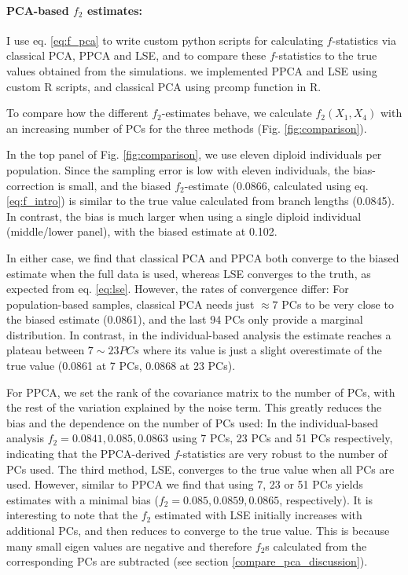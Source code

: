 \documentclass[12pt]{article}
\begin{document}
\paragraph{PCA-based $f_2$ estimates:}
I use eq. \ref{eq:f_pca} to write custom python scripts for calculating $f$-statistics via  classical PCA, PPCA and LSE, and to compare these $f$-statistics to the true values obtained from  the simulations. we implemented PPCA and LSE using custom R scripts, and classical PCA using prcomp function in R. 

To compare how the different $f_2$-estimates behave, we calculate $f_2(X_1, X_4)$  with an increasing number of PCs for the three methods (Fig. \ref{fig:comparison}).  

In the top panel of Fig. \ref{fig:comparison}, we use eleven diploid individuals per population. Since the sampling error is low with eleven individuals, the bias-correction is small, and the biased $f_2$-estimate (0.0866, calculated using eq. \ref{eq:f_intro}) is similar to the true value calculated from branch lengths (0.0845). In contrast, the bias is much larger when using a single diploid individual (middle/lower panel), with the biased estimate at 0.102. 

In either case, we find that classical PCA and PPCA both converge to the biased estimate when the full data is used, whereas LSE converges to the truth, as expected from eq. \ref{eq:lse}. However, the rates of convergence differ: For population-based samples, classical PCA needs just $\approx 7$ PCs to be very close to the biased estimate (0.0861), and the last 94 PCs only provide a marginal distribution. In contrast, in the individual-based analysis the estimate reaches a plateau between $7 \sim 23 PCs$ where its value is just a slight overestimate of the true value (0.0861 at 7 PCs, 0.0868 at 23 PCs).

For PPCA, we set the rank of the covariance matrix to the number of PCs, with the rest of the variation explained by the noise term. This greatly reduces the bias and the dependence on the number of PCs used: In the individual-based analysis $f_2 = 0.0841, 0.085, 0.0863$ using 7 PCs, 23 PCs and 51 PCs respectively, indicating that the PPCA-derived $f$-statistics are very robust to the number of PCs used. The third method, LSE, converges to the true value when all PCs are used. However, similar to PPCA we find that using 7, 23 or 51 PCs yields estimates with a minimal bias ($f_2 = 0.085, 0.0859, 0.0865$, respectively). It is interesting to note that the $f_2$ estimated with LSE initially increases with additional PCs, and then reduces to converge to the true value. This is because many small eigen values are negative and therefore $f_2$s calculated from the corresponding PCs are subtracted (see section \ref{compare_pca_discussion}).
\end{document}
